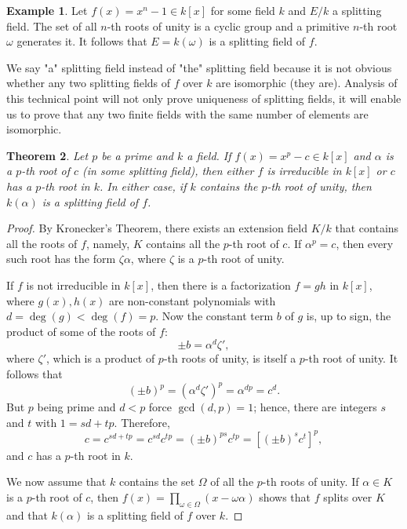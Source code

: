 \documentclass[12pt]{report}
\newtheorem{theorem}{Theorem}[section]
\theoremstyle{definition}
\newtheorem{example}[theorem]{Example}
\begin{document}
\begin{example}
	Let $f(x)=x^n-1 \in k[x]$ for some field $k$ and $E/k$ a splitting field. The set of all $n$-th roots of unity is a cyclic group and a primitive $n$-th root $\omega$ generates it. It follows that $E=k(\omega)$ is a splitting field of $f$.
\end{example}

We say "a" splitting field instead of "the" splitting field because it is not obvious whether any two splitting fields of $f$ over $k$ are isomorphic (they are). Analysis of this technical point will not only prove uniqueness of splitting fields, it will enable us to prove that any two finite fields with the same number of elements are isomorphic.

\begin{theorem}\label{kummer1}
	Let $p$ be a prime and $k$ a field. If $f(x)=x^p-c\in k[x]$ and $\alpha$ is a $p$-th root of $c$ (in some splitting field), then either $f$ is irreducible in $k[x]$ or $c$ has a $p$-th root in $k$. In either case, if $k$ contains the $p$-th root of unity, then $k(\alpha)$ is a splitting field of $f$.
\end{theorem}

\begin{proof}
	By Kronecker's Theorem, there exists an extension field $K/k$ that contains all the roots of $f$, namely, $K$ contains all the $p$-th root of $c$. If $\alpha^p=c$, then every such root has the form $\zeta\alpha$, where $\zeta$ is a $p$-th root of unity.

	If $f$ is not irreducible in $k[x]$, then there is a factorization $f = gh$ in $k[x]$, where $g(x), h(x)$ are non-constant polynomials with $d = \deg(g) < \deg(f) = p$. Now the constant term $b$ of $g$ is, up to sign, the product of some of the roots of $f$: $$\pm b = \alpha^d\zeta',$$ where $\zeta'$, which is a product of $p$-th roots of unity, is itself a $p$-th root of unity. It follows that $$(\pm b)^p = (\alpha^d\zeta')^p = \alpha^{dp} = c^d.$$
	But $p$ being prime and $d < p$ force $\gcd(d, p) = 1$; hence, there are integers $s$ and $t$ with $1 = sd + tp$. Therefore, $$c = c^{sd+tp} = c^{sd}c^{tp} = (\pm b)^{ps}c^{tp} = [(\pm b)^sc^t]^p,$$ and $c$ has a $p$-th root in $k$.

	We now assume that $k$ contains the set $\Omega$ of all the $p$-th roots of unity. If $\alpha  \in  K$ is a $p$-th root of $c$, then $f(x) =\prod_{\omega\in \Omega}(x- \omega\alpha )$ shows that $f$ splits over $K$ and that $k(\alpha)$ is a splitting field of $f$ over $k$.
\end{proof}
\end{document}
